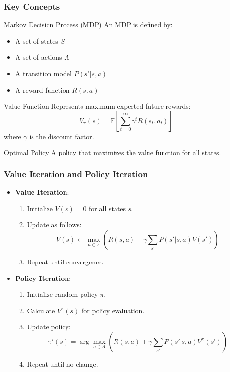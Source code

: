 \documentclass[aspectratio=169]{beamer}
\begin{document}
\begin{frame}[fragile]
    \frametitle{Key Concepts}
    \begin{block}{Markov Decision Process (MDP)}
        An MDP is defined by:
        \begin{itemize}
            \item A set of states $S$
            \item A set of actions $A$
            \item A transition model $P(s' | s, a)$
            \item A reward function $R(s, a)$
        \end{itemize}
    \end{block}
    
    \begin{block}{Value Function}
        Represents maximum expected future rewards:
        \[
        V_\pi(s) = \mathbb{E}\left[\sum_{t=0}^{\infty} \gamma^t R(s_t, a_t)\right]
        \]
        where $\gamma$ is the discount factor.
    \end{block}
    
    \begin{block}{Optimal Policy}
        A policy that maximizes the value function for all states.
    \end{block}
\end{frame}

\begin{frame}[fragile]
    \frametitle{Value Iteration and Policy Iteration}
    \begin{itemize}
        \item \textbf{Value Iteration}:
        \begin{enumerate}
            \item Initialize $V(s) = 0$ for all states $s$.
            \item Update as follows:
            \[
            V(s) \leftarrow \max_{a \in A}\left( R(s, a) + \gamma \sum_{s'}P(s'|s,a)V(s') \right)
            \]
            \item Repeat until convergence.
        \end{enumerate}
    
        \item \textbf{Policy Iteration}:
        \begin{enumerate}
            \item Initialize random policy $\pi$.
            \item Calculate $V^\pi(s)$ for policy evaluation.
            \item Update policy:
            \[
            \pi'(s) = \arg\max_{a \in A}\left( R(s, a) + \gamma \sum_{s'} P(s'|s,a)V^\pi(s') \right)
            \]
            \item Repeat until no change.
        \end{enumerate}
    \end{itemize}
\end{frame}
\end{document}
